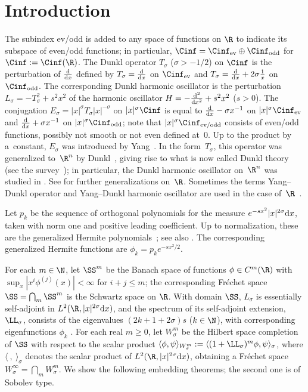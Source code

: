 \section{Introduction} \label{s:intro}

The subindex ev/odd is added to any space of functions on $\R$ to indicate its subspace of even/odd functions; in particular, $\Cinf=\Cinf_{\text{\rm ev}}\oplus\Cinf_{\text{\rm odd}}$ for $\Cinf:=\Cinf(\R)$. The Dunkl operator $T_\sigma$ ($\sigma>-1/2$) on $\Cinf$ is the perturbation of $\frac{{\rm d}}{{\rm d}x}$ def\/ined by $T_\sigma=\frac{{\rm d}}{{\rm d}x}$ on $\Cinf_{\text{\rm ev}}$ and $T_\sigma=\frac{{\rm d}}{{\rm d}x}+2\sigma\frac{1}{x}$ on $\Cinf_{\text{\rm odd}}$. The corresponding Dunkl harmonic oscillator is the perturbation $L_\sigma=-T_\sigma^2+s^2x^2$ of the harmonic oscillator $H=-\frac{{\rm d}^2}{{\rm d}x^2}+s^2x^2$ ($s>0$). The conjugation $E_\sigma=|x|^\sigma T_\sigma|x|^{-\sigma}$ on $|x|^\sigma\Cinf$ is equal to $\frac{{\rm d}}{{\rm d}x}-\sigma x^{-1}$ on $|x|^\sigma\Cinf_{\text{\rm ev}}$ and $\frac{{\rm d}}{{\rm d}x}+\sigma x^{-1}$ on $|x|^\sigma\Cinf_{\text{\rm odd}}$; note that $|x|^\sigma\Cinf_{\text{\rm ev/odd}}$ consists of even/odd functions, possibly not smooth or not even def\/ined at~$0$. Up to the product by a~constant, $E_\sigma$ was introduced by Yang~\cite{Yang1951}. In the form~$T_\sigma$, this operator was generalized to~$\R^n$ by Dunkl~\cite{Dunkl1988,Dunkl1989,Dunkl1991}, giving rise to what is now called Dunkl theory (see the survey~\cite{Rosler2003}); in particular, the Dunkl harmonic oscillator on~$\R^n$ was studied in \cite{Dunkl2002,NowakStempak2009b,NowakStempak2009a, Rosenblum1994}. See \cite{Plyushchay2000} for further generalizations on~$\R$. Sometimes the terms Yang--Dunkl operator and Yang--Dunkl harmonic oscillator are used in the case of~$\R$~\cite{Plyushchay2000}.

Let $p_k$ be the sequence of orthogonal polynomials for the measure $e^{-sx^2}|x|^{2\sigma}{\rm d}x$, taken with norm one and positive leading coef\/f\/icient. Up to normalization, these are the generalized Hermite polynomials~\cite[p.~380, Problem~25]{Szego1975}; see also \cite{Chihara1955,Chihara1978,DickinsonWarsi1963,DuttaChatterjeaMore1975,Rosenblum1994,Rosler1998}. The corresponding generalized Hermite functions are $\phi_k=p_ke^{-sx^2/2}$.

For each $m\in\N$, let $\SS^m$ be the Banach space of functions $\phi\in C^m(\R)$ with \mbox{$\sup_x|x^i\phi^{(j)}(x)|\!<\!\infty$} for $i+j\le m$; the corresponding Fr\'echet space $\SS=\bigcap_m\SS^m$ is the Schwartz space on $\R$. With domain $\SS$, $L_\sigma$ is essentially self-adjoint in $L^2(\R,|x|^{2\sigma}{\rm d}x)$, and the spectrum of its self-adjoint extension, $\LL_\sigma$, consists of the eigenvalues $(2k+1+2\sigma)s$ ($k\in\N$), with corresponding eigenfunctions $\phi_k$  \cite{Rosenblum1994}. For each real $m\ge0$, let $W_\sigma^m$ be the Hilbert space completion of $\SS$ with respect to the scalar product $\langle\phi,\psi\rangle_{W_\sigma^m}:=\langle(1+\LL_\sigma)^m\phi,\psi\rangle_\sigma$, where $\langle\ ,\ \rangle_\sigma$ denotes the scalar product of $L^2(\R,|x|^{2\sigma}{\rm d}x)$, obtaining a Fr\'echet space $W_\sigma^\infty=\bigcap_mW_\sigma^m$. We show the following embedding theorems; the second one is of Sobolev type.
